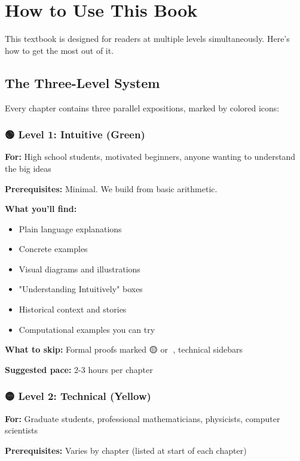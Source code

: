 \chapter*{How to Use This Book}

This textbook is designed for readers at multiple levels simultaneously. Here's how to get the most out of it.

\section*{The Three-Level System}

Every chapter contains three parallel expositions, marked by colored icons:

\subsection*{🟢 Level 1: Intuitive (Green)}

\textbf{For:} High school students, motivated beginners, anyone wanting to understand the big ideas

\textbf{Prerequisites:} Minimal. We build from basic arithmetic.

\textbf{What you'll find:}
\begin{itemize}
\item Plain language explanations
\item Concrete examples
\item Visual diagrams and illustrations
\item "Understanding Intuitively" boxes
\item Historical context and stories
\item Computational examples you can try
\end{itemize}

\textbf{What to skip:} Formal proofs marked 🟡 or 🔴, technical sidebars

\textbf{Suggested pace:} 2-3 hours per chapter

\subsection*{🟡 Level 2: Technical (Yellow)}

\textbf{For:} Graduate students, professional mathematicians, physicists, computer scientists

\textbf{Prerequisites:} Varies by chapter (listed at start of each chapter)

